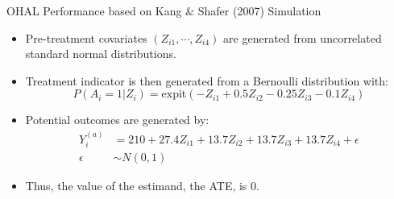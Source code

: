 \documentclass[t]{beamer}
\newlength{\wideitemsep}
\let\olditem\item
\renewcommand{\item}{\setlength{\itemsep}{\wideitemsep}\olditem}
\begin{document}


\begin{frame}{OHAL Performance based on Kang \& Shafer (2007) Simulation}

\begin{itemize}
\item Pre-treatment covariates $(Z_{i1}, \cdots, Z_{i4})$ are generated from uncorrelated standard normal distributions.
\item Treatment indicator is then generated from a Bernoulli distribution with:
\begin{equation*}
  P(A_i=1 |Z_i) = \text{expit}(- Z_{i1} + 0.5 Z_{i2} - 0.25 Z_{i3} - 0.1 Z_{i4})
\end{equation*}
\item Potential outcomes are generated by:
\begin{equation*}
  \begin{aligned}
    Y_i^{(a)} &= 210 + 27.4 Z_{i1} + 13.7 Z_{i2} + 13.7 Z_{i3} + 13.7 Z_{i4} + \epsilon\\
    \epsilon & \sim N(0, 1)
  \end{aligned}
\end{equation*}
\item Thus, the value of the estimand, the ATE, is $0$.
\end{itemize}

\end{frame}
\end{document}
